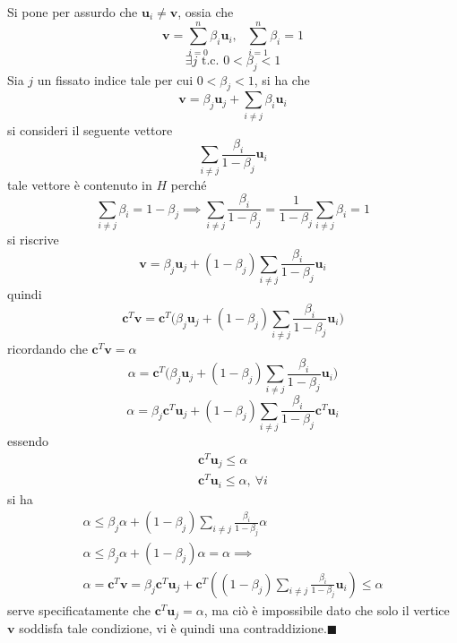 \documentclass[10pt, letterpaper]{report}
\newcommand{\bc}{{\mathbf{c}}}
\begin{document}
\begin{figure}[h]
\end{figure}
Si pone per assurdo che $\mathbf u_i\ne\mathbf v$, ossia che 
$$ \mathbf v = \sum_{i=0}^n \beta_i\mathbf u_i, \ \ \ \sum_{i=1}^n\beta_i=1$$
$$ \exists j \text{ t.c. }0<\beta_j<1$$
Sia $j$ un fissato indice tale per cui $0<\beta_j<1$, si ha che 
$$ \mathbf v = \beta_j\mathbf u_j+\sum_{i\ne j}\beta_i\mathbf u_i$$
si consideri il seguente vettore 
$$ \sum_{i\ne j}\frac{\beta_i}{1-\beta_j}\mathbf u_i$$
tale vettore è contenuto in $H$ perché 
$$ \sum_{i\ne j}\beta_i=1-\beta_j\implies \sum_{i\ne j}\frac{\beta_i}{1-\beta_j}=\frac{1}{1-\beta_j}\sum_{i\ne j}\beta_i=1$$
si riscrive 
$$ \mathbf v = \beta_j\mathbf u_j+(1-\beta_j)\sum_{i\ne j}\frac{\beta_i}{1-\beta_j}\mathbf u_i$$
quindi 
$$ \bc^T\mathbf v=\bc^T\Big(
\beta_j\mathbf u_j+(1-\beta_j)\sum_{i\ne j}\frac{\beta_i}{1-\beta_j}\mathbf u_i    
\Big)$$
ricordando che $\bc^T\mathbf v = \alpha$
$$ \alpha=\bc^T\Big(
\beta_j\mathbf u_j+(1-\beta_j)\sum_{i\ne j}\frac{\beta_i}{1-\beta_j}\mathbf u_i    
\Big)$$
$$ \alpha=
\beta_j\bc^T\mathbf u_j+(1-\beta_j)\sum_{i\ne j}\frac{\beta_i}{1-\beta_j}\bc^T\mathbf u_i    
$$
essendo $$ \begin{matrix}
    \bc^T\mathbf u_j\le \alpha \\ 
    \bc^T\mathbf u_i \le \alpha, \ \forall i
\end{matrix}$$
si ha 
\begin{eqnarray*}
    \alpha \le \beta_j\alpha+(1-\beta_j)\sum_{i\ne j}\frac{\beta_i}{1-\beta_j}\alpha\\ 
    \alpha \le \beta_j\alpha+(1-\beta_j)\alpha=\alpha\implies\\ 
    \alpha = \bc^T\mathbf v = \beta_j\bc^T\mathbf u_j+\bc^T((1-\beta_j)\sum_{i\ne j}\frac{\beta_i}{1-\beta_j}\mathbf u_i)\le \alpha 
\end{eqnarray*}
serve specificatamente che $\bc^T\mathbf u_j=\alpha$, ma ciò è impossibile dato che solo il vertice $\mathbf v$ soddisfa tale condizione, vi è quindi una contraddizione.\hfill$\blacksquare$\\
\newpage 
\end{document}

